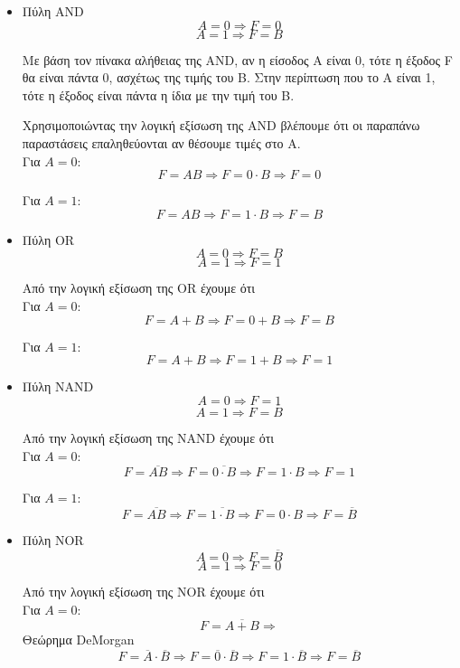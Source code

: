 \documentclass{article}
\begin{document}
\begin{itemize}
	\item
	Πύλη AND \\
	\[A = 0 \Rightarrow F = 0\]
	\[A = 1 \Rightarrow F = B\]

	Με βάση τον πίνακα αλήθειας της AND, αν η είσοδος Α είναι 0, τότε η έξοδος F
	θα είναι πάντα 0, ασχέτως της τιμής του Β. Στην περίπτωση που το Α είναι 1, τότε
	η έξοδος είναι πάντα η ίδια με την τιμή του Β.

	Χρησιμοποιώντας την λογική εξίσωση της AND βλέπουμε ότι οι παραπάνω παραστάσεις
	επαληθεύονται αν θέσουμε τιμές στο Α. \\

	Για $A = 0$:
	\[F = AB \Rightarrow F = 0 \cdot B \Rightarrow F = 0\]

	Για $A = 1$:
	\[F = AB \Rightarrow F = 1 \cdot B \Rightarrow F = B\]

	\item
	Πύλη OR
	\[A = 0 \Rightarrow F = B\]
	\[A = 1 \Rightarrow F = 1\]

	Από την λογική εξίσωση της OR έχουμε ότι \\

	Για $A = 0$:
	\[F = A + B \Rightarrow F = 0 + B \Rightarrow F = B\]

	Για $A = 1$:
	\[F = A + B \Rightarrow F = 1 + B \Rightarrow F = 1\]

	\item
	Πύλη NAND
	\[A = 0 \Rightarrow F = 1\]
	\[A = 1 \Rightarrow F = \overline{B}\]

	Από την λογική εξίσωση της NAND έχουμε ότι \\

	Για $A = 0$:
	\[F = \overline{AB} \Rightarrow F = \overline{0 \cdot B} \Rightarrow
	F = 1 \cdot B \Rightarrow F = 1\]

	Για $A = 1$:
	\[F = \overline{AB} \Rightarrow F = \overline{1 \cdot B} \Rightarrow
	F = 0 \cdot B \Rightarrow F = \overline{B}\]

	\item
	Πύλη NOR
	\[A = 0 \Rightarrow F = \overline{B}\]
	\[A = 1 \Rightarrow F = 0\]

	Από την λογική εξίσωση της NOR έχουμε ότι \\

	Για $A = 0$:
	\[F = \overline{A + B} \Rightarrow\]
	Θεώρημα DeMorgan
	\[F = \overline{A} \cdot \overline{B} \Rightarrow F = \overline{0}
	\cdot \overline{B} \Rightarrow
	F = 1 \cdot \overline{B} \Rightarrow F = \overline{B}\]


\end{itemize}
\end{document}
